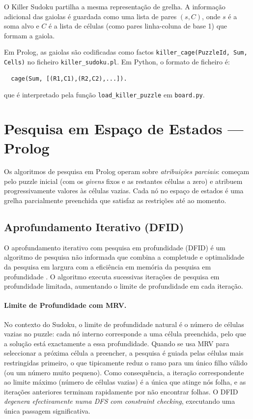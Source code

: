 O Killer Sudoku partilha a mesma representação de grelha. A informação adicional das gaiolas é guardada como uma lista de pares $(s, C)$, onde $s$ é a soma alvo e $C$ é a lista de células (como pares linha-coluna de base 1) que formam a gaiola.

Em Prolog, as gaiolas são codificadas como factos \texttt{killer\_cage(PuzzleId, Sum, Cells)} no ficheiro \texttt{killer\_sudoku.pl}. Em Python, o formato de ficheiro é:
\begin{verbatim}
  cage(Sum, [(R1,C1),(R2,C2),...]).
\end{verbatim}
que é interpretado pela função \texttt{load\_killer\_puzzle} em \texttt{board.py}.

\section{Pesquisa em Espaço de Estados — Prolog}
\label{sec:prolog}

Os algoritmos de pesquisa em Prolog operam sobre \emph{atribuições parciais}: começam pelo puzzle inicial (com os \emph{givens} fixos e as restantes células a zero) e atribuem progressivamente valores às células vazias. Cada nó no espaço de estados é uma grelha parcialmente preenchida que satisfaz as restrições até ao momento.

\subsection{Aprofundamento Iterativo (DFID)}
\label{ssec:dfid}

O aprofundamento iterativo com pesquisa em profundidade (DFID) é um algoritmo de pesquisa não informada que combina a completude e optimalidade da pesquisa em largura com a eficiência em memória da pesquisa em profundidade \cite{russell2020ai}. O algoritmo executa sucessivas iterações de pesquisa em profundidade limitada, aumentando o limite de profundidade em cada iteração.

\paragraph{Limite de Profundidade com MRV.}
No contexto do Sudoku, o limite de profundidade natural é o número de células vazias no puzzle: cada nó interno corresponde a uma célula preenchida, pelo que a solução está exactamente a essa profundidade. Quando se usa MRV para seleccionar a próxima célula a preencher, a pesquisa é guiada pelas células mais restringidas primeiro, o que tipicamente reduz o ramo para um único filho válido (ou um número muito pequeno). Como consequência, a iteração correspondente ao limite máximo (número de células vazias) é a única que atinge nós folha, e as iterações anteriores terminam rapidamente por não encontrar folhas. O DFID \emph{degenera efectivamente numa DFS com constraint checking}, executando uma única passagem significativa.

